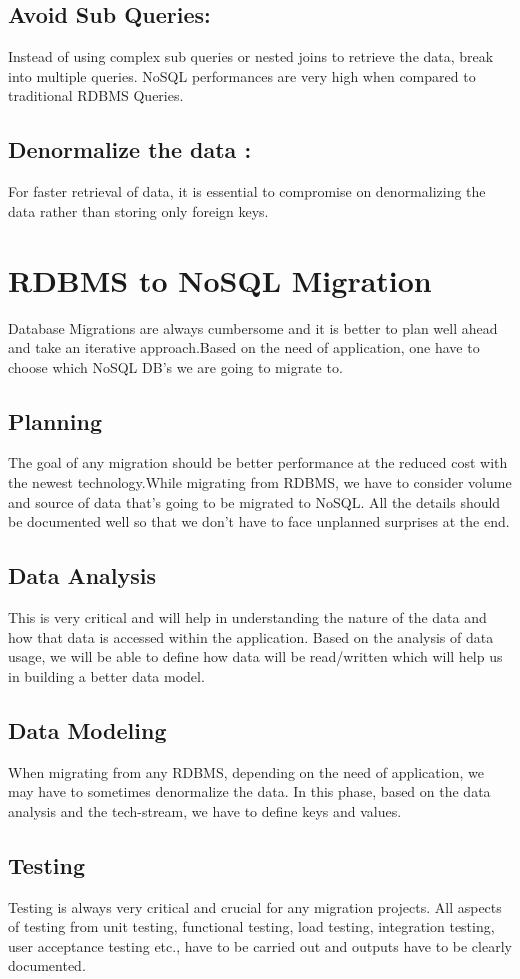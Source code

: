 \documentclass[sigconf]{acmart}
\begin{document}
\subsection{Avoid Sub Queries:} Instead of using complex sub queries or nested joins to retrieve the data, break into multiple queries. NoSQL performances are very high when compared to traditional RDBMS Queries.
\subsection{Denormalize the data :} For faster retrieval of data, it is essential to compromise on denormalizing the data rather than storing only foreign keys.
\section{RDBMS to NoSQL Migration}
Database Migrations are always cumbersome and it is better to plan well ahead and take an iterative approach.Based on the need of application, one have to choose which NoSQL DB's we are going to migrate to. \cite{aws}
\subsection{Planning}  
The goal of any migration should be better performance at the reduced cost with the newest technology.While migrating from RDBMS, we have to consider volume and source of data that's going to be migrated to NoSQL. All the details should be documented well so that we don't have to face unplanned surprises at the end.
\subsection{Data Analysis} 
This is very critical and will help in understanding the nature of the data and how that data is accessed within the application. Based on the analysis of data usage, we will be able to define how data will be read/written which will help us in building a better data model.
\subsection{Data Modeling} 
When migrating from any RDBMS, depending on the need of application, we may have to sometimes denormalize the data. In this phase, based on the data analysis and the tech-stream, we have to define keys and values.
\subsection{Testing} 
Testing is always very critical and crucial for any migration projects. All aspects of testing from unit testing, functional testing, load testing, integration testing, user acceptance testing etc., have to be carried out and outputs have to be clearly documented. 
\end{document}
